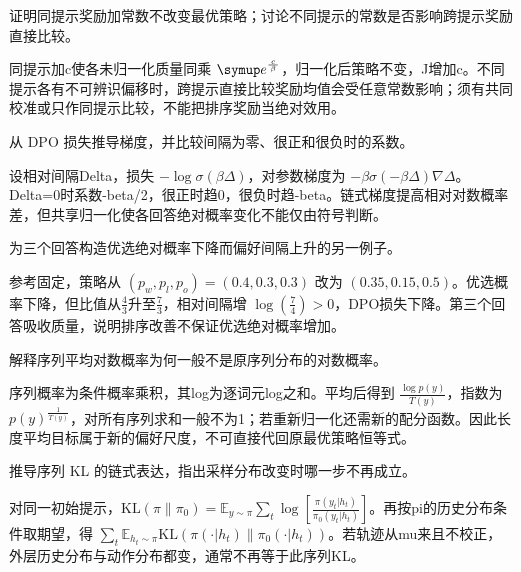 \begin{exercises}
\begin{exercise} 证明同提示奖励加常数不改变最优策略；讨论不同提示的常数是否影响跨提示奖励直接比较。

\begin{solution}
同提示加c使各未归一化质量同乘 $\conste{}^{\frac{c}{\beta}}$，归一化后策略不变，J增加c。不同提示各有不可辨识偏移时，跨提示直接比较奖励均值会受任意常数影响；须有共同校准或只作同提示比较，不能把排序奖励当绝对效用。
\end{solution}
\end{exercise}

\begin{exercise} 从 DPO 损失推导梯度，并比较间隔为零、很正和很负时的系数。

\begin{solution}
设相对间隔Delta，损失 $-\log\sigma(\beta\Delta)$，对参数梯度为 $-\beta\sigma(-\beta\Delta)\nabla\Delta$。Delta=0时系数-beta/2，很正时趋0，很负时趋-beta。链式梯度提高相对对数概率差，但共享归一化使各回答绝对概率变化不能仅由符号判断。
\end{solution}
\end{exercise}

\begin{exercise} 为三个回答构造优选绝对概率下降而偏好间隔上升的另一例子。

\begin{solution}
参考固定，策略从 $(p_w,p_l,p_o)=(0.4,0.3,0.3)$ 改为 $(0.35,0.15,0.5)$。优选概率下降，但比值从$\frac{4}{3}$升至$\frac{7}{3}$，相对间隔增 $\log(\frac{7}{4})>0$，DPO损失下降。第三个回答吸收质量，说明排序改善不保证优选绝对概率增加。
\end{solution}
\end{exercise}

\begin{exercise} 解释序列平均对数概率为何一般不是原序列分布的对数概率。

\begin{solution}
序列概率为条件概率乘积，其log为逐词元log之和。平均后得到 $\frac{\log p(y)}{T(y)}$，指数为 $p(y)^{\frac{1}{T(y)}}$，对所有序列求和一般不为1；若重新归一化还需新的配分函数。因此长度平均目标属于新的偏好尺度，不可直接代回原最优策略恒等式。
\end{solution}
\end{exercise}

\begin{exercise} 推导序列 KL 的链式表达，指出采样分布改变时哪一步不再成立。

\begin{solution}
对同一初始提示，$\mathrm{KL}(\pi\|\pi_0)=\mathbb E_{y\sim\pi}\sum_t\log[\frac{\pi(y_t|h_t)}{\pi_0(y_t|h_t)}]$。再按pi的历史分布条件取期望，得 $\sum_t\mathbb E_{h_t\sim\pi}\mathrm{KL}(\pi(\cdot|h_t)\|\pi_0(\cdot|h_t))$。若轨迹从mu来且不校正，外层历史分布与动作分布都变，通常不再等于此序列KL。
\end{solution}
\end{exercise}


\end{exercises}
